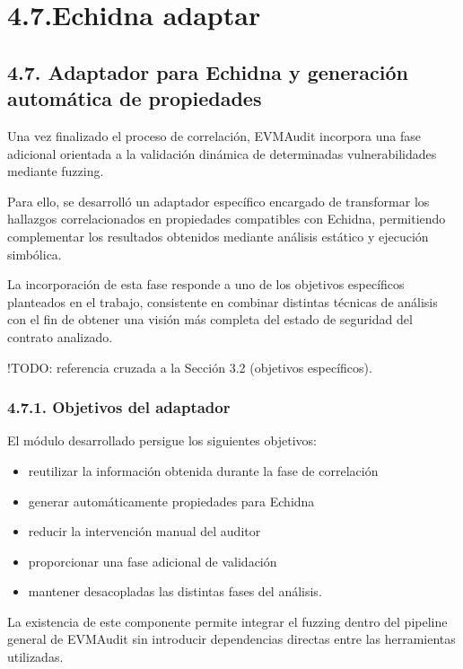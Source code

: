 \section{4.7.Echidna adaptar}\label{echidna-adaptar}

\subsection{4.7. Adaptador para Echidna y generación automática de
propiedades}\label{adaptador-para-echidna-y-generaciuxf3n-automuxe1tica-de-propiedades}

Una vez finalizado el proceso de correlación, EVMAudit incorpora una
fase adicional orientada a la validación dinámica de determinadas
vulnerabilidades mediante fuzzing.

Para ello, se desarrolló un adaptador específico encargado de
transformar los hallazgos correlacionados en propiedades compatibles con
Echidna, permitiendo complementar los resultados obtenidos mediante
análisis estático y ejecución simbólica.

La incorporación de esta fase responde a uno de los objetivos
específicos planteados en el trabajo, consistente en combinar distintas
técnicas de análisis con el fin de obtener una visión más completa del
estado de seguridad del contrato analizado.

!TODO: referencia cruzada a la Sección 3.2 (objetivos específicos).

\subsubsection{4.7.1. Objetivos del
adaptador}\label{objetivos-del-adaptador}

El módulo desarrollado persigue los siguientes objetivos:

\begin{itemize}
\tightlist
\item
  reutilizar la información obtenida durante la fase de correlación
\item
  generar automáticamente propiedades para Echidna
\item
  reducir la intervención manual del auditor
\item
  proporcionar una fase adicional de validación
\item
  mantener desacopladas las distintas fases del análisis.
\end{itemize}

La existencia de este componente permite integrar el fuzzing dentro del
pipeline general de EVMAudit sin introducir dependencias directas entre
las herramientas utilizadas.

